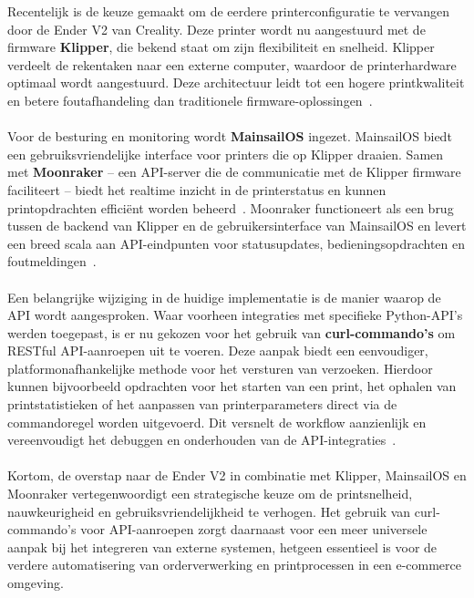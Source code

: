 Recentelijk is de keuze gemaakt om de eerdere printerconfiguratie te vervangen door de Ender V2 van Creality. Deze printer wordt nu aangestuurd met de firmware \textbf{Klipper}, die bekend staat om zijn flexibiliteit en snelheid. Klipper verdeelt de rekentaken naar een externe computer, waardoor de printerhardware optimaal wordt aangestuurd. Deze architectuur leidt tot een hogere printkwaliteit en betere foutafhandeling dan traditionele firmware-oplossingen~\autocite{klipper3dDoc}.
\\\\
Voor de besturing en monitoring wordt \textbf{MainsailOS} ingezet. MainsailOS biedt een gebruiksvriendelijke interface voor printers die op Klipper draaien. Samen met \textbf{Moonraker} – een API-server die de communicatie met de Klipper firmware faciliteert – biedt het realtime inzicht in de printerstatus en kunnen printopdrachten efficiënt worden beheerd~\autocite{moonrakerDoc}. Moonraker functioneert als een brug tussen de backend van Klipper en de gebruikersinterface van MainsailOS en levert een breed scala aan API-eindpunten voor statusupdates, bedieningsopdrachten en foutmeldingen~\autocite{moonrakerDoc}.
\\\\
Een belangrijke wijziging in de huidige implementatie is de manier waarop de API wordt aangesproken. Waar voorheen integraties met specifieke Python-API’s werden toegepast, is er nu gekozen voor het gebruik van \textbf{curl-commando’s} om RESTful API-aanroepen uit te voeren. Deze aanpak biedt een eenvoudiger, platformonafhankelijke methode voor het versturen van verzoeken. Hierdoor kunnen bijvoorbeeld opdrachten voor het starten van een print, het ophalen van printstatistieken of het aanpassen van printerparameters direct via de commandoregel worden uitgevoerd. Dit versnelt de workflow aanzienlijk en vereenvoudigt het debuggen en onderhouden van de API-integraties~\autocite{mainsailManual}.
\\\\
Kortom, de overstap naar de Ender V2 in combinatie met Klipper, MainsailOS en Moonraker vertegenwoordigt een strategische keuze om de printsnelheid, nauwkeurigheid en gebruiksvriendelijkheid te verhogen. Het gebruik van curl-commando’s voor API-aanroepen zorgt daarnaast voor een meer universele aanpak bij het integreren van externe systemen, hetgeen essentieel is voor de verdere automatisering van orderverwerking en printprocessen in een e-commerce omgeving.




